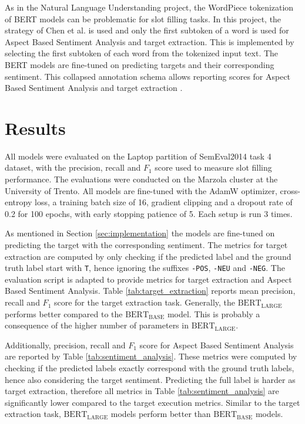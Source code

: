 \documentclass[a4paper]{article}
\begin{document}
As in the Natural Language Understanding project, the WordPiece \cite{wu2016googlesneuralmachinetranslation} tokenization of BERT models can be problematic for slot filling tasks. In this project, the strategy of Chen et al. \cite{chen2019bertjointintentclassification} is used and only the first subtoken of a word is used for Aspect Based Sentiment Analysis and target extraction. This is implemented by selecting the first subtoken of each word from the tokenized input text. The BERT models are fine-tuned on predicting targets and their corresponding sentiment. This collapsed annotation schema allows reporting scores for Aspect Based Sentiment Analysis and target extraction \cite{hu2019opendomaintargetedsentimentanalysis}.

\section{Results}
All models were evaluated on the Laptop partition of SemEval2014 task 4 dataset, with the precision, recall and $F_1$ score used to measure slot filling performance. The evaluations were conducted on the Marzola cluster at the University of Trento. All models are fine-tuned with the AdamW \cite{loshchilov2019decoupledweightdecayregularization} optimizer, cross-entropy loss, a training batch size of 16, gradient clipping and a dropout rate of 0.2 for 100 epochs, with early stopping patience of 5. Each setup is run 3 times. 

As mentioned in Section \ref{sec:implementation} the models are fine-tuned on predicting the target with the corresponding sentiment. The metrics for target extraction are computed by only checking if the predicted label and the ground truth label start with \texttt{T}, hence ignoring the suffixes \texttt{-POS}, \texttt{-NEU} and \texttt{-NEG}. The evaluation script is adapted to provide metrics for target extraction and Aspect Based Sentiment Analysis. Table \ref{tab:target_extraction} reports mean precision, recall and $F_1$ score for the target extraction task. Generally, the $\text{BERT}_{\text{LARGE}}$ performs better compared to the $\text{BERT}_{\text{BASE}}$ model. This is probably a consequence of the higher number of parameters in $\text{BERT}_{\text{LARGE}}$.

Additionally, precision, recall and $F_1$ score for Aspect Based Sentiment Analysis are reported by Table \ref{tab:sentiment_analysis}. These metrics were computed by checking if the predicted labels exactly correspond with the ground truth labels, hence also considering the target sentiment. Predicting the full label is harder as target extraction, therefore all metrics in Table \ref{tab:sentiment_analysis} are significantly lower compared to the target execution metrics. Similar to the target extraction task, $\text{BERT}_{\text{LARGE}}$ models perform better than $\text{BERT}_{\text{BASE}}$ models.
\end{document}
